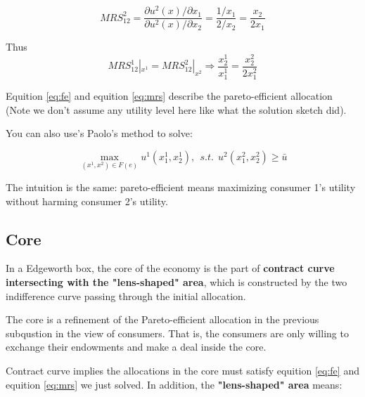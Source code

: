 \documentclass{article}
\begin{document}
$$MRS^2_{12} = \frac{\partial u^2(x) / \partial x_1}{\partial u^2(x) / \partial x_2} = \frac{1/x_1}{2/x_2} = \frac{x_2}{2x_1}$$

Thus 
\begin{equation}
MRS^1_{12} |_{x^1} = MRS^2_{12}|_{x^2} \Rightarrow
\frac{x^1_2}{x^1_1} = \frac{x^2_2}{2x^2_1}
\label{eq:mrs}
\end{equation}

Equition \ref{eq:fe} and equition \ref{eq:mrs} describe the pareto-efficient allocation (Note we don't assume any utility level here like what the solution sketch did).

\begin{mdframed}[backgroundcolor=blue!20,linecolor=white]
You can also use's Paolo's method to solve:

$$\max_{(x^1,x^2) \in F(e)} u^1(x^1_1,x^1_2), \ \ s.t. \ \ u^2(x^2_1,x^2_2) \ge \bar{u}$$

The intuition is the same: pareto-efficient means maximizing consumer 1's utility without harming consumer 2's utility.

\end{mdframed}

\subsection{Core}
\begin{mdframed}[backgroundcolor=blue!20,linecolor=white]

In a Edgeworth box, the core of the economy is the
part of \textbf{contract curve intersecting with the "lens-shaped" area}, which is constructed by the two indifference curve passing through the initial allocation.

\vspace{2mm}

The core is a refinement of the Pareto-efficient allocation in the previous subqustion in the view of consumers. That is, the consumers are only willing to exchange their endowments and make a deal inside the core.

\end{mdframed}

\vspace{2mm}

Contract curve implies the allocations in the core must satisfy
equition \ref{eq:fe} and equition \ref{eq:mrs} we just solved.
In addition, the \textbf{"lens-shaped" area} means:
\end{document}
